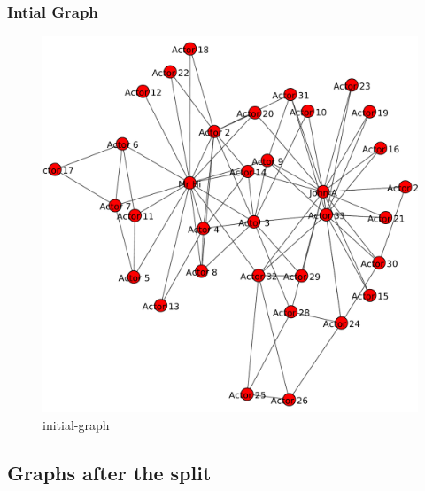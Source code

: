 \documentclass[12pt]{article}
\begin{document}
\subsubsection{Intial Graph}
\begin{figure}[ht]
\includegraphics[scale=0.7]{../Q1/graph1.pdf}
\centering
\caption{initial-graph}
\label{fig:initial-graph}
\end{figure}
\newpage

\subsection{Graphs after the split}
\end{document}
